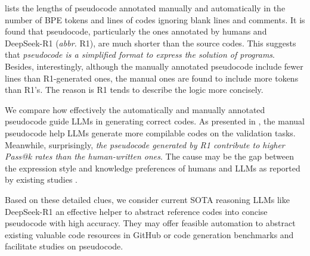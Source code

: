  lists the lengths of pseudocode annotated manually and automatically in the number of BPE tokens \cite{tiktoken} and lines of codes ignoring blank lines and comments. It is found that pseudocode, particularly the ones annotated by humans and DeepSeek-R1 (\textit{abbr.} R1), are much shorter than the source codes. This suggests that \textit{pseudocode is a simplified format to express the solution of programs}.
Besides, interestingly, although the manually annotated pseudocode include fewer lines than R1-generated ones, the manual ones are found to include more tokens than R1's. The reason is R1 tends to describe the logic more concisely.





 We compare how effectively the automatically and manually annotated pseudocode guide LLMs in generating correct codes. As presented in , the manual pseudocode help LLMs generate more compilable codes on the validation tasks. Meanwhile, surprisingly, \textit{the pseudocode generated by R1 contribute to higher Pass@k rates than the human-written ones}. The cause may be the gap between the expression style and knowledge preferences of humans and LLMs as reported by existing studies \cite{ase24-llmpreference}. %





Based on these detailed clues, we consider current SOTA reasoning LLMs like DeepSeek-R1 an effective helper to abstract reference codes into concise pseudocode with high accuracy.
They may offer feasible automation to abstract existing valuable code resources in GitHub or code generation benchmarks and facilitate studies on pseudocode.







